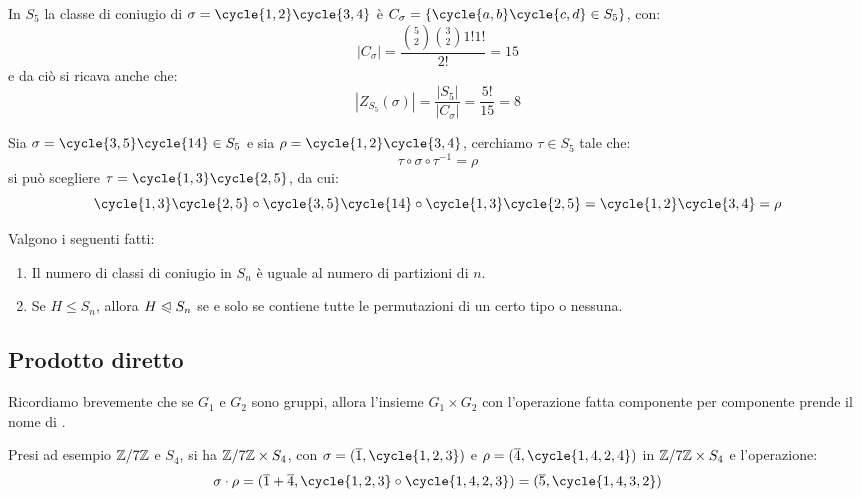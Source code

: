 \documentclass[11pt]{scrartcl}
\begin{document}
\begin{example}
    In $S_5$ la classe di coniugio di $\sigma = \cycle{1,2}\cycle{3,4}$ è $C_\sigma = \{\cycle{a,b}\cycle{c,d} \in S_5\}$, con:
        \[ |C_\sigma| = \frac{\binom{5}{2}\binom{3}{2}1!1!}{2!} = 15
            \]
    e da ciò si ricava anche che:
        \[ |Z_{S_5}(\sigma)| = \frac{|S_5|}{|C_\sigma|} = \frac{5!}{15} = 8
            \]
\end{example}

\begin{example}
    Sia $\sigma = \cycle{3,5}\cycle{14} \in S_5$ e sia $\rho = \cycle{1,2}\cycle{3,4}$, cerchiamo $\tau \in S_5$ tale che:
        \[ \tau\circ\sigma\circ\tau^{-1} = \rho
            \]
    si può scegliere $\tau = \cycle{1,3}\cycle{2,5}$, da cui:
        \[ \cycle{1,3}\cycle{2,5}\circ\cycle{3,5}\cycle{14}\circ\cycle{1,3}\cycle{2,5} = \cycle{1,2}\cycle{3,4} = \rho
            \]
\end{example}

\begin{corollary}
    \label{c:1.68}
    Valgono i seguenti fatti:
        \begin{enumerate}[(1)]
            \item Il numero di classi di coniugio in $S_n$ è uguale al numero di partizioni di $n$.
            \item Se $H \leqslant S_n$, allora $H \trianglelefteqslant S_n$ se e solo se contiene tutte le permutazioni di un certo tipo o nessuna.
        \end{enumerate}
\end{corollary}

\pagebreak

\subsection{Prodotto diretto}
Ricordiamo brevemente che se $G_1$ e $G_2$ sono gruppi, allora l'insieme $G_1 \times G_2$ con l'operazione fatta componente per componente prende il nome di .

\begin{example}
    Presi ad esempio $\mathbb{Z}/{7}\mathbb{Z}$ e $S_4$, si ha $\mathbb{Z}/{7}\mathbb{Z} \times S_4$, con $\sigma = (\overline 1, \cycle{1,2,3})$ e $\rho = (\overline 4, \cycle{1,4,2,4})$ in $\mathbb{Z}/{7}\mathbb{Z} \times S_4$ e l'operazione:
        \[ \sigma \cdot \rho = (\overline 1 + \overline 4, \cycle{1,2,3} \circ \cycle{1,4,2,3}) = (\overline 5, \cycle{1,4,3,2})
            \]
\end{example}
\end{document}
